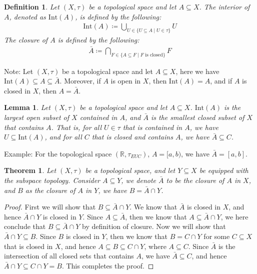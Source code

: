 \documentclass[11pt]{book}
\theoremstyle{break}
\theoremstyle{break}
\newtheorem{thm}{Theorem}[section]
\newtheorem{lem}{Lemma}[thm]
\newtheorem{defn}{Definition}[corL]
\newcommand{\R}{\mathbb{R}}
\newcommand{\Int}{\text{Int}}
\newcommand{\note}{\color{red}Note: \color{black}}
\newcommand{\example}{\color{green}Example: \color{black}}
\begin{document}
\begin{defn}
Let $(X,\tau)$ be a topological space and let $A\subseteq X$. The interior of $A$, denoted as $\Int(A)$, is defined by the following:
\begin{align*}
\Int(A) \coloneqq \bigcup_{U \in \{ U \subseteq A \mid U \in \tau\}} U
\end{align*}
The closure of $A$ is defined by the following:
\begin{align*}
\bar{A} \coloneqq \bigcap_{F\in \{ A\subseteq F \mid F\text{ is closed}\}} F
\end{align*}
\end{defn}

\note Let $(X,\tau)$ be a topological space and let $A\subseteq X$, here we have $\Int(A)\subseteq A \subseteq \bar{A}$. Moreover, if $A$ is open in $X$, then $\Int(A) = A$, and if $A$ is closed in $X$, then $A = \bar{A}$.\\

\begin{lem}
Let $(X,\tau)$ be a topological space and let $A\subseteq X$. $\Int(A)$ is the largest open subset of $X$ contained in $A$, and $\bar{A}$ is the smallest closed subset of $X$ that contains $A$. That is, for all $U \in \tau$ that is contained in $A$, we have $U\subseteq \Int(A)$, and for all $C$ that is closed and contains $A$, we have $\bar{A}\subseteq C$. 
\end{lem}

\example For the topological space $(\R, \tau_{EUC})$, $A = [a,b)$, we have $\bar{A} = [a,b]$. \\

\begin{thm}
Let $(X,\tau)$ be a topological space, and let $Y \subseteq X$ be equipped with the subspace topology. Consider $A\subseteq Y$, we denote $\bar{A}$ to be the closure of $A$ in $X$, and $B$ as the closure of $A$ in $Y$, we have $B = \bar{A}\cap Y$. 
\end{thm}
\begin{proof}
First we will show that $B \subseteq \bar{A}\cap Y$. We know that $\bar{A}$ is closed in $X$, and hence $\bar{A}\cap Y$ is closed in $Y$. Since $A \subseteq \bar{A}$, then we know that $A \subseteq \bar{A}\cap Y$, we here conclude that $B \subseteq \bar{A}\cap Y$ by definition of closure. Now we will show that $\bar{A}\cap Y \subseteq B$. Since $B$ is closed in $Y$, then we know that $B = C\cap Y$ for some $C \subseteq X$ that is closed in $X$, and hence $A \subseteq B \subseteq C\cap Y$, where $A \subseteq C$. Since $\bar{A}$ is the intersection of all closed sets that contains $A$, we have $\bar{A}\subseteq C$, and hence $\bar{A}\cap Y \subseteq C\cap Y = B$. This completes the proof.
\end{proof}
\end{document}
